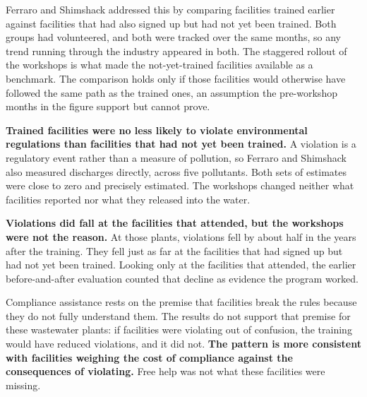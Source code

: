 \documentclass[
  11pt,
]{article}
\newcommand{\sectionhead}[1]{%
  \vspace{2pt}{\color{ink}\bfseries\fontsize{9.75pt}{12pt}\selectfont
  \textls[20]{\MakeUppercase{#1}}\par}\vspace{1pt}}
\begin{document}
\noindent Ferraro and Shimshack addressed this by comparing facilities trained earlier against facilities that had also signed up but had not yet been trained. Both groups had volunteered, and both were tracked over the same months, so any trend running through the industry appeared in both. The staggered rollout of the workshops is what made the not-yet-trained facilities available as a benchmark. The comparison holds only if those facilities would otherwise have followed the same path as the trained ones, an assumption the pre-workshop months in the figure support but cannot prove.

\vspace{6pt}


\sectionhead{No effect on violations or discharges}
\noindent \textbf{Trained facilities were no less likely to violate environmental regulations than facilities that had not yet been trained.} A violation is a regulatory event rather than a measure of pollution, so Ferraro and Shimshack also measured discharges directly, across five pollutants. Both sets of estimates were close to zero and precisely estimated. The workshops changed neither what facilities reported nor what they released into the water.

\noindent \textbf{Violations did fall at the facilities that attended, but the workshops were not the reason.} At those plants, violations fell by about half in the years after the training. They fell just as far at the facilities that had signed up but had not yet been trained. Looking only at the facilities that attended, the earlier before-and-after evaluation counted that decline as evidence the program worked.

\noindent Compliance assistance rests on the premise that facilities break the rules because they do not fully understand them. The results do not support that premise for these wastewater plants: if facilities were violating out of confusion, the training would have reduced violations, and it did not. \textbf{The pattern is more consistent with facilities weighing the cost of compliance against the consequences of violating.} Free help was not what these facilities were missing.

\vspace{8pt}
\end{document}
